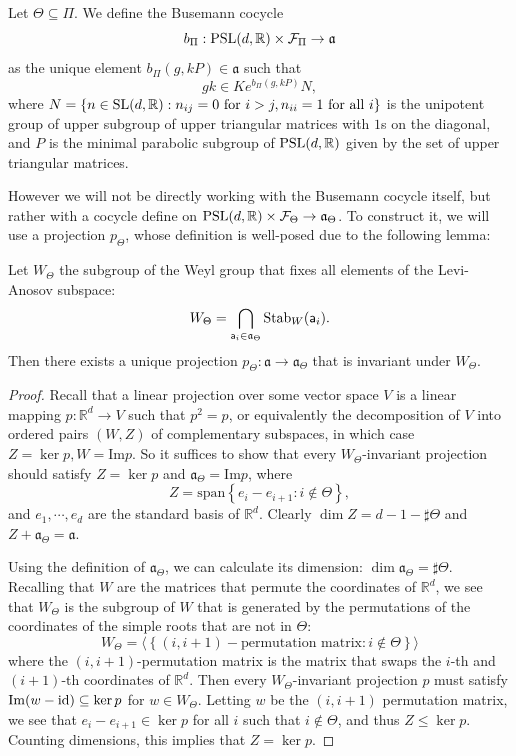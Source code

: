 \documentclass{report}
\begin{document}
\begin{definition}
    Let $\Theta \subseteq \Pi$. We define the Busemann cocycle
    \[
    b_\Pi : \operatorname{{\mathrm{PSL}}}(d, \mathbb R) \times \mathcal F_\Pi \to \mathfrak a
    \]
    as the unique element $b_\Pi(g, k P) \in \mathfrak a$ such that
    \[
    g k \in K e^{b_\Pi(g, k P)} N,
    \]
    where $N = \{ n \in \operatorname{{\mathrm{SL}}}(d, \mathbb R) : n_{ij} = 0 \text{ for } i > j, n_{ii} = 1 \text{ for all } i \}$ is the unipotent group of upper subgroup of upper triangular matrices with $1$s on the diagonal, and $P$ is the minimal parabolic subgroup of $\operatorname{{\mathrm{PSL}}}(d, \mathbb R)$ given by the set of upper triangular matrices.
\end{definition}
However we will not be directly working with the Busemann cocycle itself, but rather with a cocycle define on $\operatorname{{\mathrm{PSL}}}(d, \mathbb R) \times \mathcal F_\Theta \to \mathfrak a_\Theta$.
To construct it, we will use a projection $p_\Theta$, whose definition is well-posed due to the following lemma:
\begin{lemma}
    Let $W_\Theta$ the subgroup of the Weyl group that fixes all elements of the Levi-Anosov subspace:
    \[
        W_\Theta = \bigcap_{\mathsf{a}_i \in \mathfrak a_\Theta} \operatorname{Stab}_W(\mathsf{a}_i).
    \]
    Then there exists a unique projection $p_\Theta: \mathfrak a \to \mathfrak a_\Theta$ that is invariant under $W_\Theta$.
\end{lemma}
\begin{proof}
    Recall that a linear projection over some vector space $V$ is a linear mapping $p: \mathbb R^d \to V$ such that $p^2 = p$, or equivalently the decomposition of $V$ into ordered pairs $(W,Z)$ of complementary subspaces, in which case $Z = \ker p, W = \mathrm{Im} p$.
    So it suffices to show that every $W_\Theta$-invariant projection should satisfy $Z = \ker p$ and $\mathfrak a_\Theta = \mathrm{Im} p$, where 
    \[
    Z = \mathrm{span}\left\{ e_i - e_{i+1}:  i \not \in \Theta \right\},
    \]
    and $e_1, \cdots, e_d$ are the standard basis of $\mathbb R^d$.
    Clearly $\dim Z = d -1 - \sharp \Theta$ and $Z + \mathfrak a_\Theta = \mathfrak a$.

    Using the definition of $\mathfrak a_\Theta$, we can calculate its dimension:
    $\dim \mathfrak a_\Theta = \sharp \Theta$.
    Recalling that $W$ are the matrices that permute the coordinates of $\mathbb R^d$, we see that $W_\Theta$ is the subgroup of $W$ that is generated by the permutations of the coordinates of the simple roots that are not in $\Theta$:
    \[
    W_\Theta = \langle \left\{ (i, i+1)-\text{permutation matrix} : i \not \in \Theta \right\} \rangle
    \]
    where the $(i, i+1)$-permutation matrix is the matrix that swaps the $i$-th and $(i+1)$-th coordinates of $\mathbb R^d$.
    Then every $W_\Theta$-invariant projection $p$ must satisfy $\mathrm{Im}(w - \operatorname{id}) \subseteq \ker p$ for $w \in W_\Theta$.
    Letting $w$ be the $(i, i+1)$ permutation matrix, we see that $e_i - e_{i+1} \in \ker p$ for all $i$ such that $i \not \in \Theta$, and thus $Z \leq \ker p$.
    Counting dimensions, this implies that $Z = \ker p$. 
\end{proof}
\end{document}
